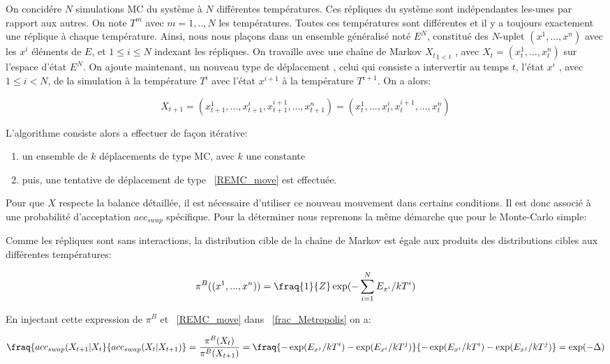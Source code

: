 On concidére $N$ simulations MC du système à $N$ différentes températures. Ces répliques du système sont indépendantes les-unes par rapport aux autres. On note $T^m$ avec $m=1,..,N$ les températures. Toutes ces températures sont différentes et il y a toujours exactement une réplique à chaque température. Ainsi, nous nous plaçons dans un ensemble généralisé noté $E^N$, constitué des $N$-uplet $(x^1,...,x^n)$ avec les $x^i$ éléments de $E$, et $1 \leq i \leq N$  indexant les répliques. On travaille avec une chaîne de Markov ${X_t}_{1<t}$ , avec $X_t=(x^1_t,...,x^n_t)$ sur l'espace d'état $E^N$. On ajoute maintenant, un nouveau type de déplacement , celui qui consiste a intervertir au temps $t$, l'état $x^i$ , avec $1 \leq i <  N$, de la simulation à la température $T^i$ avec l'état $x^{i+1}$ à la température $T^{i+1}$. On a alors:

\begin{equation}
  \label{REMC_move}
X_{t+1}=(x_{t+1}^1,...,x_{t+1}^i,x_{t+1}^{i+1},...,x_{t+1}^n) = (x_t^1,...,x_t^i,x_t^{i+1},...,x_t^n)
\end{equation}

L'algorithme consiste alors a effectuer de façon itérative:
\begin{enumerate}
\item un ensemble de $k$ déplacements de type MC, avec $k$ une constante  

\item puis, une tentative de déplacement de type ~\ref{REMC_move}  est effectuée.
\end{enumerate}

Pour que $X$ respecte la balance détaillée, il est nécessaire d'utiliser ce nouveau mouvement dans certains conditions. Il est donc associé à une probabilité d'acceptation $acc_{swap}$ spécifique. Pour la déterminer nous reprenons la même démarche que pour le Monte-Carlo simple:

Comme les répliques sont sans interactions, la distribution cible de la chaîne de Markov est égale aux produits des distributions cibles aux différentes températures:

\begin{equation}
\pi^B((x^1,...,x^n))=\fraq{1}{Z}\exp(-\sum_{i=1}^N E_{x^i}/kT^i)
\end{equation}


En injectant cette expression de $\pi^B$ et ~\ref{REMC_move} dans ~\ref{frac_Metropolis} on a:


\begin{equation}
  \label{fraq_swap}

\fraq{acc_{swap}(X_{t+1}|X_t}{acc_{swap}(X_t|X_{t+1})} =\frac{\pi^B(X_t)}{\pi^B(X_{t+1})} = \fraq{-\exp(E_{x^j}/kT^i) -\exp(E_{x^i}/kT^j)}{-\exp(E_{x^i}/kT^i) -\exp(E_{x^j}/kT^j)} = \exp(-\Delta) 
\end{equation}

